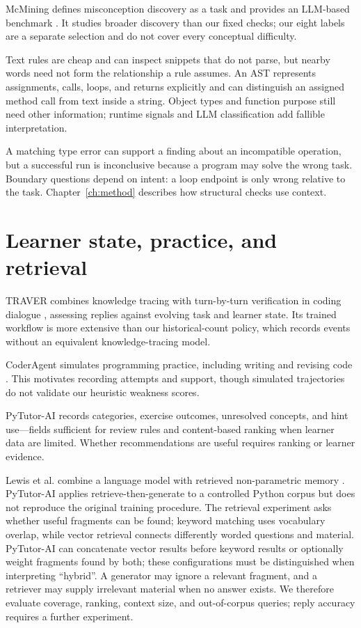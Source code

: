 McMining defines misconception discovery as a task and provides an LLM-based benchmark \citep{mcmining2025}. It studies broader discovery than our fixed checks; our eight labels are a separate selection and do not cover every conceptual difficulty.

Text rules are cheap and can inspect snippets that do not parse, but nearby words need not form the relationship a rule assumes. An AST represents assignments, calls, loops, and returns explicitly \citep{pythonast} and can distinguish an assigned method call from text inside a string. Object types and function purpose still need other information; runtime signals and LLM classification add fallible interpretation.

A matching type error can support a finding about an incompatible operation, but a successful run is inconclusive because a program may solve the wrong task. Boundary questions depend on intent: a loop endpoint is only wrong relative to the task. Chapter~\ref{ch:method} describes how structural checks use context.

\section{Learner state, practice, and retrieval}
TRAVER combines knowledge tracing with turn-by-turn verification in coding dialogue \citep{traver2025}, assessing replies against evolving task and learner state. Its trained workflow is more extensive than our historical-count policy, which records events without an equivalent knowledge-tracing model.

CoderAgent simulates programming practice, including writing and revising code \citep{coderagent2025}. This motivates recording attempts and support, though simulated trajectories do not validate our heuristic weakness scores.

PyTutor-AI records categories, exercise outcomes, unresolved concepts, and hint use---fields sufficient for review rules and content-based ranking when learner data are limited. Whether recommendations are useful requires ranking or learner evidence.

Lewis et al. combine a language model with retrieved non-parametric memory \citep{rag2020}. PyTutor-AI applies retrieve-then-generate to a controlled Python corpus but does not reproduce the original training procedure. The retrieval experiment asks whether useful fragments can be found; keyword matching uses vocabulary overlap, while vector retrieval connects differently worded questions and material. PyTutor-AI can concatenate vector results before keyword results or optionally weight fragments found by both; these configurations must be distinguished when interpreting ``hybrid''. A generator may ignore a relevant fragment, and a retriever may supply irrelevant material when no answer exists. We therefore evaluate coverage, ranking, context size, and out-of-corpus queries; reply accuracy requires a further experiment.

